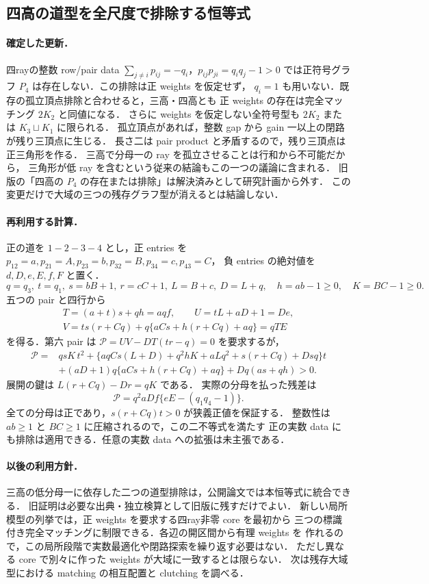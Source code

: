 \subsection{四高の道型を全尺度で排除する恒等式}
\label{nfh25:section}

\paragraph{確定した更新．}
四rayの整数 row/pair data
$\sum_{j\ne i}p_{ij}=-q_i$，$p_{ij}p_{ji}=q_iq_j-1>0$
では正符号グラフ $P_4$ は存在しない．この排除は正 weights を仮定せず，
$q_i=1$ も用いない．既存の孤立頂点排除と合わせると，三高・四高とも
正 weights の存在は完全マッチング $2K_2$ と同値になる．
さらに weights を仮定しない全符号型も $2K_2$ または $K_3\sqcup K_1$ に限られる．
孤立頂点があれば，整数 gap から gain 一以上の閉路が残り三頂点に生じる．
長さ二は pair product と矛盾するので，残り三頂点は正三角形を作る．
三高で分母一の ray を孤立させることは行和から不可能だから，
三角形が低 ray を含むという従来の結論もこの一つの議論に含まれる．
旧版の「四高の $P_4$ の存在または排除」は解決済みとして研究計画から外す．
この変更だけで大域の三つの残存グラフ型が消えるとは結論しない．

\paragraph{再利用する計算．}
正の道を $1-2-3-4$ とし，正 entries を
$p_{12}=a,p_{21}=A,p_{23}=b,p_{32}=B,p_{34}=c,p_{43}=C$，
負 entries の絶対値を $d,D,e,E,f,F$ と置く．
\[
 q=q_3,\ t=q_1,\ s=bB+1,\ r=cC+1,\ L=B+c,\ D=L+q,
 \quad h=ab-1\ge0,\quad K=BC-1\ge0.
\]
五つの pair と四行から
\begin{gather*}
 T=(a+t)s+qh=aqf,\qquad U=tL+aD+1=De,\\
 V=ts(r+Cq)+q\{aCs+h(r+Cq)+aq\}=qTE
\end{gather*}
を得る．第六 pair は $\mathcal P=UV-DT(tr-q)=0$ を要求するが，
\begin{align*}
 \mathcal P={}&qsK\,t^2
 +\{aqCs(L+D)+q^2hK+aLq^2+s(r+Cq)+Dsq\}t\\
 &+(aD+1)q\{aCs+h(r+Cq)+aq\}+Dq(as+qh)>0.
\end{align*}
展開の鍵は $L(r+Cq)-Dr=qK$ である．
実際の分母を払った残差は
\[
 \mathcal P=q^2aDf\{eE-(q_1q_4-1)\}.
\]
全ての分母は正であり，$s(r+Cq)t>0$ が狭義正値を保証する．
整数性は $ab\ge1$ と $BC\ge1$ に圧縮されるので，この二不等式を満たす
正の実数 data にも排除は適用できる．任意の実数 data への拡張は未主張である．

\paragraph{以後の利用方針．}
三高の低分母一に依存した二つの道型排除は，公開論文では本恒等式に統合できる．
旧証明は必要な出典・独立検算として旧版に残すだけでよい．
新しい局所模型の列挙では，正 weights を要求する四ray非零 core を最初から
三つの標識付き完全マッチングに制限できる．各辺の開区間から有理 weights を
作れるので，この局所段階で実数最適化や閉路探索を繰り返す必要はない．
ただし異なる core で別々に作った weights が大域に一致するとは限らない．
次は残存大域型における matching の相互配置と clutching を調べる．

